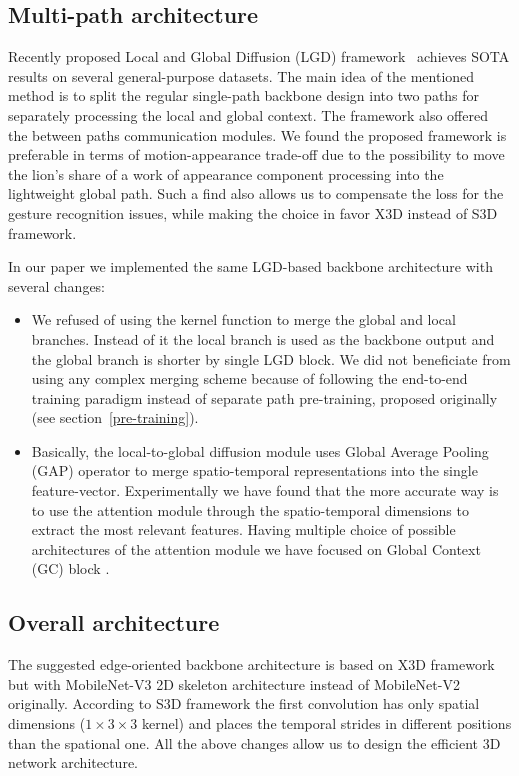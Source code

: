 \documentclass[twoside, twocolumn]{article}
\begin{document}
\subsection{Multi-path architecture}

\lettrine[nindent=0em,lines=3]{R}{}ecently proposed Local and Global Diffusion (LGD) framework~\cite{LGD} achieves SOTA
results on several general-purpose datasets. The main idea of the mentioned method is to split the regular single-path
backbone design into two paths for separately processing the local and global context. The framework also offered the
between paths communication modules. We found the proposed framework is preferable in terms of motion-appearance trade-off
due to the possibility to move the lion's share of a work of appearance component processing into the lightweight global
path. Such a find also allows us to compensate the loss for the gesture recognition issues, while making the choice in
favor X3D instead of S3D framework.

In our paper we implemented the same LGD-based backbone architecture with several changes:
\begin{itemize}
\item We refused of using the kernel function to merge the global and local branches. Instead of it the local branch is
used as the backbone output and the global branch is shorter by single LGD block. We did not beneficiate from using any
complex merging scheme because of following the end-to-end training paradigm instead of separate path pre-training,
proposed originally (see section~\ref{pre-training}).

\item Basically, the local-to-global diffusion module uses Global Average Pooling (GAP) operator to merge
spatio-temporal representations into the single feature-vector. Experimentally we have found that the more accurate way
is to use the attention module through the spatio-temporal dimensions to extract the most relevant features. Having
multiple choice of possible architectures of the attention module we have focused on Global Context (GC) block
\cite{GCN}.
\end{itemize}

\subsection{Overall architecture}

\lettrine[nindent=0em,lines=3]{T}{}he suggested edge-oriented backbone architecture is based on X3D framework but with
MobileNet-V3 2D skeleton architecture instead of MobileNet-V2 originally. According to S3D framework the first
convolution has only spatial dimensions ($1 \times 3 \times 3$ kernel) and places the temporal strides in different
positions than the spational one. All the above changes allow us to design the efficient 3D network architecture.
\end{document}
